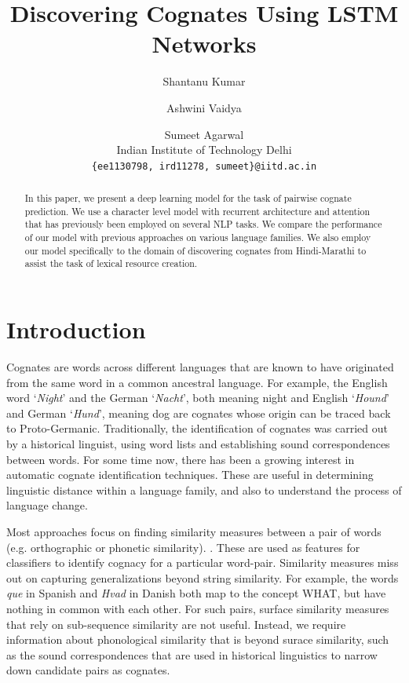\documentclass[11pt,letterpaper]{article}
\title{Discovering Cognates Using LSTM Networks}
\author{Shantanu Kumar \and Ashwini Vaidya \and Sumeet Agarwal \\ 
  Indian Institute of Technology Delhi
  \\ {\tt \{ee1130798, ird11278, sumeet\}@iitd.ac.in}}
\date{}
\begin{document}
\maketitle

\begin{abstract}
In this paper, we present a deep learning model for the task of pairwise cognate prediction. We use a character level model with recurrent architecture and attention that has previously been employed on several NLP tasks. We compare the performance of our model with previous approaches on various language families. We also employ our model specifically to the domain of discovering cognates from Hindi-Marathi to assist the task of lexical resource creation.
\end{abstract}

\section{Introduction}
Cognates are words across different languages that are known to have originated from the same word in a common ancestral language. For example, the English word `\textit{Night}' and the German `\textit{Nacht}’, both meaning night and English `\textit{Hound}’ and German `\textit{Hund}’, meaning dog are cognates whose origin can be traced back to Proto-Germanic. Traditionally, the identification of cognates was carried out by a historical linguist, using word lists and establishing sound correspondences between words. For some time now, there has been a growing interest in automatic cognate identification techniques. These are useful in determining linguistic distance within a language family, and also to understand the process of language change. 

Most approaches focus on finding similarity measures between a pair of words (e.g. orthographic or phonetic similarity). \citep{hauer2011clustering, inkpen2005similarity,List2016g}. These are used as features for classifiers to identify cognacy for a particular word-pair. Similarity measures miss out on capturing generalizations beyond string similarity. For example, the words \textit{que} in Spanish and \textit{Hvad} in Danish both map to the concept \textsc{WHAT}, but have nothing in common with each other. For such pairs, surface similarity measures that rely on sub-sequence similarity are not useful. Instead, we require information about phonological similarity that is beyond surace similarity, such as the sound correspondences that are used in historical linguistics to narrow down candidate pairs as cognates.
\end{document}
